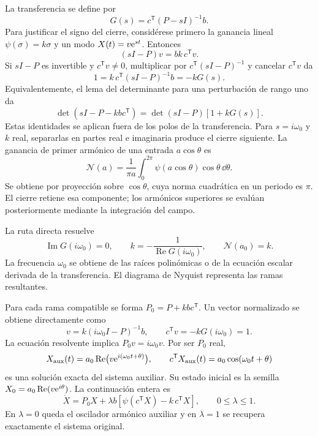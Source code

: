 La transferencia se define por
\begin{equation}
  G(s)=c^{\mathsf T}(P-sI)^{-1}b.
  \label{int:eq:transfer}
\end{equation}
Para justificar el signo del cierre, considérese primero la ganancia lineal
\(\psi(\sigma)=k\sigma\) y un modo \(X(t)=v\mathrm e^{st}\). Entonces
\[
 (sI-P)v=bk\,c^{\mathsf T}v.
\]
Si \(sI-P\) es invertible y \(c^{\mathsf T}v\ne0\), multiplicar por
\(c^{\mathsf T}(sI-P)^{-1}\) y cancelar \(c^{\mathsf T}v\) da
\[
 1=k\,c^{\mathsf T}(sI-P)^{-1}b=-kG(s).
\]
Equivalentemente, el lema del determinante para una perturbación de rango uno
da
\[
 \det(sI-P-kbc^{\mathsf T})=\det(sI-P)[1+kG(s)].
\]
Estas identidades se aplican fuera de los polos de la transferencia. Para
\(s=i\omega_0\) y \(k\) real, separarlas en partes real e imaginaria
produce el cierre siguiente. La ganancia de primer armónico de una entrada
\(a\cos\theta\) es
\[
 \mathcal N(a)=\frac1{\pi a}\int_0^{2\pi}
                   \psi(a\cos\theta)\cos\theta\,\dd\theta.
\]
Se obtiene por proyección sobre \(\cos\theta\), cuya norma cuadrática en
un periodo es \(\pi\). El cierre retiene esa componente; los armónicos
superiores se evalúan posteriormente mediante la integración del campo.

La ruta directa resuelve
\begin{equation}
  \operatorname{Im}G(i\omega_0)=0,\qquad
  k=-\frac{1}{\operatorname{Re}G(i\omega_0)},\qquad
  \mathcal N(a_0)=k.
  \label{int:eq:balance}
\end{equation}
La frecuencia \(\omega_0\) se obtiene de las raíces polinómicas o de la
ecuación escalar derivada de la transferencia. El diagrama de Nyquist
representa las ramas resultantes.

Para cada rama compatible se forma \(P_0=P+kbc^{\mathsf T}\). Un vector
normalizado se obtiene directamente como
\[
 v=k(i\omega_0I-P)^{-1}b,\qquad
 c^{\mathsf T}v=-kG(i\omega_0)=1.
\]
La ecuación resolvente implica \(P_0v=i\omega_0v\). Por ser \(P_0\) real,
\[
 X_{\rm aux}(t)=a_0\operatorname{Re}
       \bigl(v\mathrm e^{i(\omega_0t+\theta)}\bigr),\qquad
 c^{\mathsf T}X_{\rm aux}(t)=a_0\cos(\omega_0t+\theta)
\]
es una solución exacta del sistema auxiliar. Su estado inicial es la semilla
\(X_0=a_0\operatorname{Re}(v\mathrm e^{i\theta})\). La continuación entera es
\begin{equation}
  \dot X=P_0X+\lambda b
  \left[\psi(c^{\mathsf T}X)-k\,c^{\mathsf T}X\right],
  \qquad 0\leq\lambda\leq1.
  \label{int:eq:homotopy}
\end{equation}
En $\lambda=0$ queda el oscilador armónico auxiliar y en $\lambda=1$ se
recupera exactamente el sistema original.

